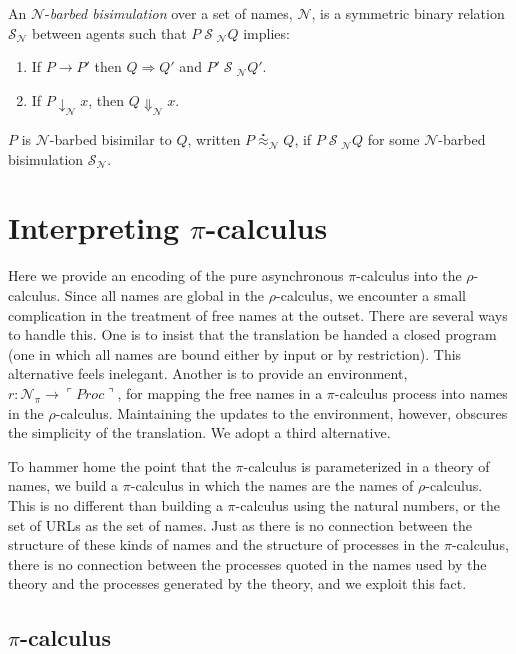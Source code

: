 \documentclass[]{entcs}
\newcommand{\lpquote}{\ulcorner}
\newcommand{\rpquote}{\urcorner}
\newcommand{\quotep}[1]{\lpquote #1 \rpquote}
\newcommand{\QProc}{\quotep{\mathbin{Proc}}}
\newcommand{\red}{\rightarrow}
\newcommand{\wred}{\Rightarrow}
\newcommand{\rel}[1]{\;{\mathcal #1}\;} %
\newcommand{\wbbisim}{\stackrel{\centerdot}{\approx}} %
\newcommand{\pic}{$\pi$-calculus}
\newcommand{\rhoc}{$\rho$-calculus}
\begin{document}
\begin{definition}
An  ${\mathcal N}$-\emph{barbed bisimulation} over a set of names, ${\mathcal N}$, is a symmetric binary relation 
${\mathcal S}_{\mathcal N}$ between agents such that $P\rel{S}_{\mathcal N}Q$ implies:
\begin{enumerate}
\item If $P \red P'$ then $Q \wred Q'$ and $P'\rel{S}_{\mathcal N} Q'$.
\item If $P\downarrow_{\mathcal N} x$, then $Q\Downarrow_{\mathcal N} x$.
\end{enumerate}
$P$ is ${\mathcal N}$-barbed bisimilar to $Q$, written
$P \wbbisim_{\mathcal N} Q$, if $P \rel{S}_{\mathcal N} Q$ for some ${\mathcal N}$-barbed bisimulation ${\mathcal S}_{\mathcal N}$.
\end{definition}

\section{Interpreting \pic}

Here we provide an encoding of the pure asynchronous {\pic} into the
{\rhoc}. Since all names are global in the {\rhoc}, we encounter a
small complication in the treatment of free names at the outset. There
are several ways to handle this. One is to insist that the translation
be handed a closed program (one in which all names are bound either by
input or by restriction). This alternative feels inelegant. Another is
to provide an environment, $r : \mathcal{N}_{\pi} \rightarrow \QProc$,
for mapping the free names in a {\pic} process into names in the
{\rhoc}. Maintaining the updates to the environment, however, obscures
the simplicity of the translation. We adopt a third alternative.

To hammer home the point that the {\pic} is parameterized in a theory
of names, we build a {\pic} in which the names are the names of
{\rhoc}. This is no different than building a {\pic} using the natural
numbers, or the set of URLs as the set of names. Just as there is no
connection between the structure of these kinds of names and the
structure of processes in the {\pic}, there is no connection between
the processes quoted in the names used by the theory and the processes
generated by the theory, and we exploit this fact.

\subsection{\pic}
\end{document}
